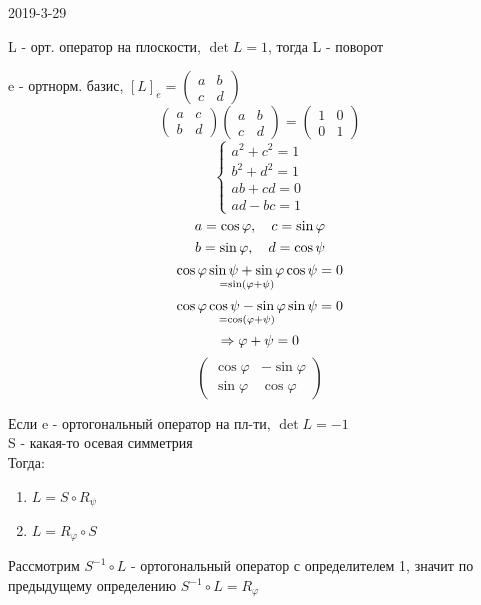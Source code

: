 \documentclass[12pt, fleqn]{article}
\begin{document}
\begin{lect}{2019-3-29}
  \begin{definition}
    L - орт. оператор на плоскости, $\det L = 1$, тогда L - поворот
  \end{definition}

  e - ортнорм. базис, $[L]_e = \begin{pmatrix}
    a & b\\
    c & d
  \end{pmatrix}$
  \[\begin{pmatrix}
    a & c\\
    b & d
  \end{pmatrix} \begin{pmatrix}
    a & b\\
    c & d
  \end{pmatrix} = \begin{pmatrix}
    1 & 0\\
    0 & 1
  \end{pmatrix}\]
  \[\begin{cases}
    a^2 + c^2 = 1\\
    b^2 + d^2 = 1\\
    ab + cd = 0\\
    ad - bc = 1
  \end{cases}\]
  \[a = \cos \varphi,\quad c = \sin \varphi\]
  \[b = \sin \varphi,\quad d = \cos \psi\]
  \[\underset{= \sin(\varphi + \psi)}{\cos \varphi \sin \psi + \sin \varphi \cos \psi} = 0\]
  \[\underset{= \cos(\varphi + \psi)}{\cos \varphi \cos \psi - \sin \varphi \sin \psi} = 0\]
  \[\Rightarrow \varphi + \psi = 0\]
  \[\begin{pmatrix}
    \cos \varphi & - \sin \varphi\\
    \sin \varphi & \cos \varphi
  \end{pmatrix}\]

  \begin{definition}
    Если e - ортогональный оператор на пл-ти, $\det L = -1$\\
    S - какая-то осевая симметрия\\
    Тогда:
    \begin{enumerate}
      \item $L = S \circ R_{\psi}$
      \item $L = R_{\varphi} \circ S$
    \end{enumerate}
  \end{definition}

  Рассмотрим $S^{-1} \circ L$ - ортогональный оператор с определителем 1, значит по предыдущему определению $S^{-1} \circ L = R_{\varphi}$


\end{lect}
\end{document}
